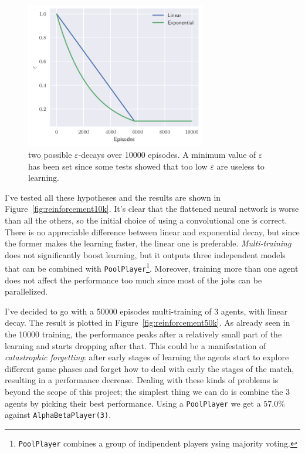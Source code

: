 \documentclass{article}
\newcommand{\ipy}[1]{\texttt{#1}}
\begin{document}
  \begin{figure}
    \centering
    \includegraphics[width=0.7\textwidth]{img/decay.pdf}
    
    \caption{two possible \(\varepsilon\)-decays over 10000 episodes. A minimum value of \(\varepsilon\) has been set since some tests showed that too low \(\varepsilon\) are useless to learning.}
    \label{fig:decays}
  \end{figure}

  I've tested all these hypotheses and the results are shown in Figure~\ref{fig:reinforcement10k}. It's clear that the flattened neural network is worse than all the others, so the initial choice of using a convolutional one is correct. There is no appreciable difference between linear and exponential decay, but since the former makes the learning faster, the linear one is preferable.
  \emph{Multi-training} does not significantly boost learning, but it outputs three independent models that can be combined with \ipy{PoolPlayer}\footnote{\ipy{PoolPlayer} combines a group of indipendent players ysing majority voting.}. Moreover, training more than one agent does not affect the performance too much since most of the jobs can be parallelized.
 
  I've decided to go with a 50000 episodes multi-training of 3 agents, with linear decay. The result is plotted in Figure~\ref{fig:reinforcement50k}. As already seen in the 10000 training, the performance peaks after a relatively small part of the learning and starts dropping after that. This could be a manifestation of \emph{catastrophic forgetting}\cite{kirkpatrick2017overcoming}: after early stages of learning the agents start to explore different game phases and forget how to deal with early the stages of the match, resulting in a performance decrease. Dealing with these kinds of problems is beyond the scope of this project; the simplest thing we can do is combine the 3 agents by picking their best performance. Using a \ipy{PoolPlayer} we get a \(57.0\si{\percent}\) against \ipy{AlphaBetaPlayer(3)}.
  
\end{document}
